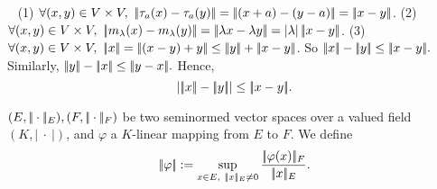 \begin{proofenv}
    \ \newline
    (1) $\forall(x,y)\in V\times V,\ |\!| \tau_a(x)-\tau_a(y)|\!|=|\!|(x+a)-(y-a)|\!|=|\!| x-y|\!|$.
    \newline
    (2) $\forall (x,y)\in V\times V,\ |\!| m_\lambda(x)-m_\lambda(y)|\!|=|\!|\lambda x-\lambda y|\!|=\left|\lambda\right||\!| x-y|\!| $.
    \newline
    (3) $\forall (x,y)\in V\times V,\ \pl x\pl =\pl (x-y)+y\pl\le\pl y\pl+\pl x-y\pl$. So $|\!| x|\!| -|\!| y|\!| \le |\!| x-y|\!|.$ Similarly, $|\!| y|\!| -|\!| x|\!| \le |\!| y-x|\!|.$ Hence,
    $$\left||\!| x|\!|-|\!| y|\!|\right|\le |\!| x-y|\!|.$$
\end{proofenv}
\begin{definitionenv}
    $(E,|\!|\cdot|\!|_E),(F,|\!|\cdot|\!|_F)$ be two seminormed vector spaces over a valued field $(K,\left|\ \cdot\ \right|)$, and $\varphi$ a $K$-linear mapping from $E$ to $F$. We define 
    $$\pl\varphi\pl:=\sup_{x\in E,\ \pl x\pl_E\neq 0}\frac{\pl\varphi(x)\pl_F}{\pl x\pl_E}.$$
\end{definitionenv}
